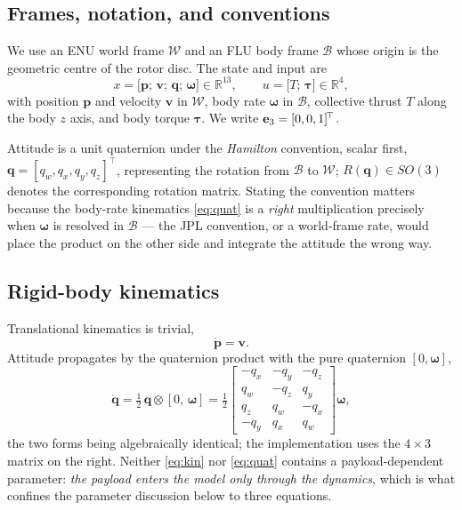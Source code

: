 \subsection{Frames, notation, and conventions}\label{sec:model:frames}

We use an ENU world frame $\mathcal{W}$ and an FLU body frame
$\mathcal{B}$ whose origin is the geometric centre of the rotor disc.
The state and input are
\begin{equation}
x = \bigl[\mathbf{p};\, \mathbf{v};\, \mathbf{q};\, \boldsymbol{\omega}\bigr] \in \mathbb{R}^{13},
\qquad
u = \bigl[T;\, \boldsymbol{\tau}\bigr] \in \mathbb{R}^{4},
\label{eq:state}
\end{equation}
with position $\mathbf{p}$ and velocity $\mathbf{v}$ in $\mathcal{W}$,
body rate $\boldsymbol{\omega}$ in $\mathcal{B}$, collective thrust $T$
along the body $z$ axis, and body torque $\boldsymbol{\tau}$. We write
$\mathbf{e}_3 = [0,0,1]^{\!\top}$.

Attitude is a unit quaternion under the \emph{Hamilton} convention,
scalar first, $\mathbf{q} = [q_w, q_x, q_y, q_z]^{\!\top}$, representing
the rotation from $\mathcal{B}$ to $\mathcal{W}$; $R(\mathbf{q}) \in SO(3)$
denotes the corresponding rotation matrix. Stating the convention matters
because the body-rate kinematics \eqref{eq:quat} is a \emph{right}
multiplication precisely when $\boldsymbol{\omega}$ is resolved in
$\mathcal{B}$ --- the JPL convention, or a world-frame rate, would place
the product on the other side and integrate the attitude the wrong way.

\subsection{Rigid-body kinematics}\label{sec:model:kin}

Translational kinematics is trivial,
\begin{equation}
\dot{\mathbf{p}} = \mathbf{v}. \label{eq:kin}
\end{equation}
Attitude propagates by the quaternion product with the pure quaternion
$[0, \boldsymbol{\omega}]$,
\begin{equation}
\dot{\mathbf{q}} = \tfrac{1}{2}\, \mathbf{q} \otimes [0,\, \boldsymbol{\omega}]
= \tfrac{1}{2}
\begin{bmatrix}
-q_x & -q_y & -q_z \\
 q_w & -q_z &  q_y \\
 q_z &  q_w & -q_x \\
-q_y &  q_x &  q_w
\end{bmatrix} \boldsymbol{\omega},
\label{eq:quat}
\end{equation}
the two forms being algebraically identical; the implementation uses the
$4 \times 3$ matrix on the right. Neither \eqref{eq:kin} nor
\eqref{eq:quat} contains a payload-dependent parameter: \emph{the payload
enters the model only through the dynamics}, which is what confines the
parameter discussion below to three equations.


